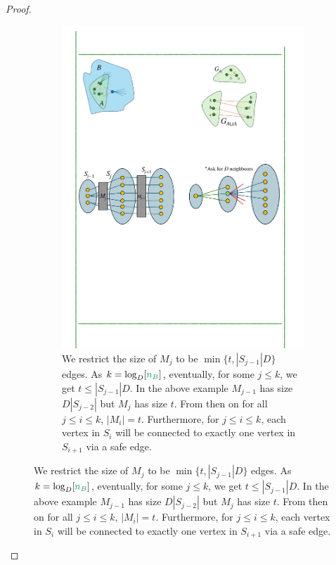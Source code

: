 \documentclass[11pt]{article}
\begin{document}
\begin{proof}
\begin{figure}[t!]
\begin{subfigure}[t]{0.95\textwidth}
        \label{subfig:embeddingA}
    \end{subfigure}%
    \hspace{1mm}
    \hspace{1mm}
    \begin{subfigure}[t]{0.95\textwidth}
        \centering
        \includegraphics[]{assets/embeddingB.pdf}
        \caption{We restrict the size of $M_j$ to be $\min\{t, |S_{j-1}|D\}$ edges. As $k = \log_{D}[\na]$, eventually, for some $j \leq k$, we get $t \leq |S_{j-1}|D$.
        In the above example $M_{j-1}$ has size $D|S_{j-2}|$ but $M_j$ has size $t$. 
        From then on for all $j \leq i \leq k$, $|M_i|= t$.
        Furthermore, for $j \leq i \leq k$,  each vertex in $S_i$ will be connected to exactly one vertex in $S_{i+1}$ via a safe edge.
        }
        \label{subfig:embeddingB}        
    \end{subfigure}
\end{figure}





\end{proof}
\end{document}
